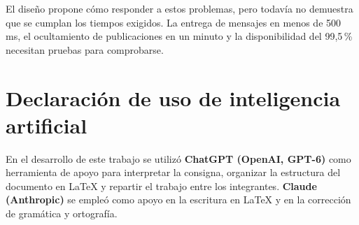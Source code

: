 \documentclass[12pt,a4paper]{article}
\begin{document}
El diseño propone cómo responder a estos problemas, pero
todavía no demuestra que se cumplan los tiempos exigidos.
La entrega de mensajes en menos de 500 ms, el ocultamiento
de publicaciones en un minuto y la disponibilidad del
99,5\,\% necesitan pruebas para comprobarse.




\section{Declaración de uso de inteligencia artificial}

En el desarrollo de este trabajo se utilizó \textbf{ChatGPT (OpenAI, GPT-6)} como herramienta de apoyo para interpretar la consigna, organizar la estructura del documento en \LaTeX{} y repartir el trabajo entre los integrantes. \textbf{Claude
(Anthropic)} se empleó como apoyo en la escritura en \LaTeX{} y en la
corrección de gramática y ortografía. 



\printbibliography[
    heading=bibintoc,
    title={Referencias}
]
\end{document}
